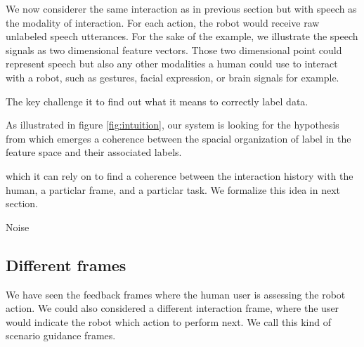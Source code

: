 We now considerer the same interaction as in previous section but with speech as the modality of interaction. For each action, the robot would receive raw unlabeled speech utterances. For the sake of the example, we illustrate the speech signals as two dimensional feature vectors. Those two dimensional point could represent speech but also any other modalities a human could use to interact with a robot, such as gestures, facial expression, or brain signals for example.



The key challenge it to find out what it means to correctly label data.

As illustrated in figure \ref{fig:intuition}, our system is looking for the hypothesis from which emerges a coherence between the spacial organization of label in the feature space and their associated labels.

which it can rely on to find a coherence between the interaction history with the human, a particlar frame, and a particlar task. We formalize this idea in next section.

Noise


\subsection{Different frames}

We have seen the feedback frames where the human user is assessing the robot action. We could also considered a different interaction frame, where the user would indicate the robot which action to perform next. We call this kind of scenario guidance frames.





